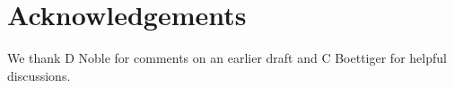 \documentclass[a4paper,num-refs]{assets/oup-contemporary}
\begin{document}
\section{Acknowledgements}

We thank D Noble for comments on an earlier draft and C Boettiger for helpful discussions. 




\end{document}
